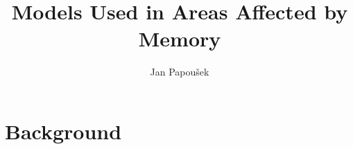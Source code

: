 \documentclass[a4paper]{article}
\title{Models Used in Areas Affected by Memory}
\author{Jan Papou\v{s}ek}
\begin{document}
\maketitle

\section{Background}


\nocite{*}

\end{document}
